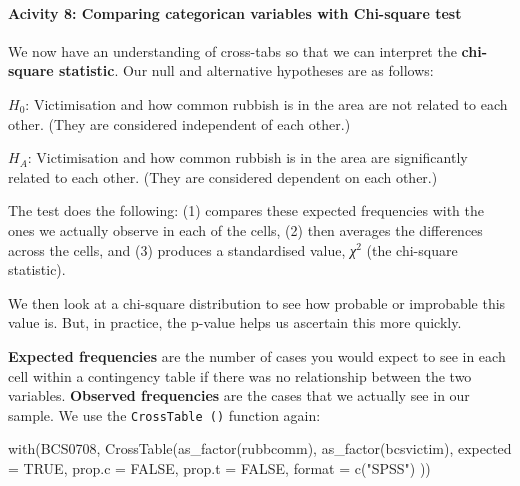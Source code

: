 \documentclass[
]{book}
\newenvironment{Shaded}{\begin{snugshade}}{\end{snugshade}}
\newcommand{\AttributeTok}[1]{\textcolor[rgb]{0.77,0.63,0.00}{#1}}
\newcommand{\ConstantTok}[1]{\textcolor[rgb]{0.00,0.00,0.00}{#1}}
\newcommand{\FunctionTok}[1]{\textcolor[rgb]{0.00,0.00,0.00}{#1}}
\newcommand{\NormalTok}[1]{#1}
\newcommand{\StringTok}[1]{\textcolor[rgb]{0.31,0.60,0.02}{#1}}
\begin{document}
\hypertarget{acivity-8-comparing-categorican-variables-with-chi-square-test}{%
\paragraph{Acivity 8: Comparing categorican variables with Chi-square test}\label{acivity-8-comparing-categorican-variables-with-chi-square-test}}

We now have an understanding of cross-tabs so that we can interpret the \textbf{chi-square statistic}. Our null and alternative hypotheses are as follows:

\(H_0\): Victimisation and how common rubbish is in the area are not related to each other. (They are considered independent of each other.)

\(H_A\): Victimisation and how common rubbish is in the area are significantly related to each other. (They are considered dependent on each other.)

The test does the following:
(1) compares these expected frequencies with the ones we actually observe in each of the cells, (2) then averages the differences across the cells, and (3) produces a standardised value, \emph{χ}\(^2\) (the chi-square statistic).

We then look at a chi-square distribution to see how probable or improbable this value is. But, in practice, the p-value helps us ascertain this more quickly.

\textbf{Expected frequencies} are the number of cases you would expect to see in each cell within a contingency table if there was no relationship between the two variables. \textbf{Observed frequencies} are the cases that we actually see in our sample. We use the \texttt{CrossTable\ ()} function again:

\begin{Shaded}
\begin{Highlighting}[]
\FunctionTok{with}\NormalTok{(BCS0708, }\FunctionTok{CrossTable}\NormalTok{(}\FunctionTok{as\_factor}\NormalTok{(rubbcomm), }
                         \FunctionTok{as\_factor}\NormalTok{(bcsvictim), }
                         \AttributeTok{expected =} \ConstantTok{TRUE}\NormalTok{, }\AttributeTok{prop.c =} \ConstantTok{FALSE}\NormalTok{, }\AttributeTok{prop.t =} \ConstantTok{FALSE}\NormalTok{, }\AttributeTok{format =}
                           \FunctionTok{c}\NormalTok{(}\StringTok{"SPSS"}\NormalTok{) ))}
\end{Highlighting}
\end{Shaded}
\end{document}
